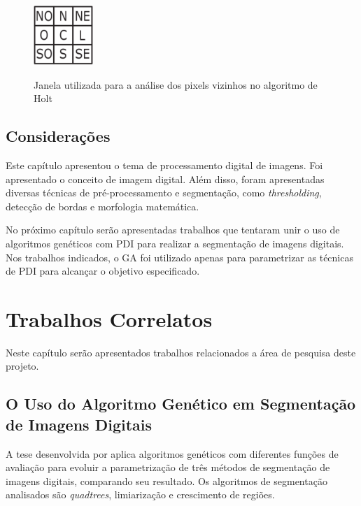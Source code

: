 \documentclass[12pt,oneside,a4paper,english,french,spanish,brazil,]{abntex2}
\begin{document}
\begin{figure}[ht]
\centering
\caption{Janela utilizada para a análise dos pixels vizinhos no algoritmo de Holt}
\includegraphics[width=0.2\textwidth]{imagens/PDI_Holt_1.PNG}
\label{fig:PDI_Holt_1}
\end{figure}

\section{Considerações}

Este capítulo apresentou o tema de processamento digital de imagens. Foi apresentado o conceito de imagem digital. Além disso, foram apresentadas diversas técnicas de pré-processamento e segmentação, como \textit{thresholding}, detecção de bordas e morfologia matemática.

No próximo capítulo serão apresentadas trabalhos que tentaram unir o uso de algoritmos genéticos com PDI para realizar a segmentação de imagens digitais. Nos trabalhos indicados, o GA foi utilizado apenas para parametrizar as técnicas de PDI para alcançar o objetivo especificado.

\chapter{Trabalhos Correlatos}
\label{chap:TrabalhosCorrelatos}

Neste capítulo serão apresentados trabalhos relacionados a área de pesquisa deste projeto.


\section{O Uso do Algoritmo Genético em Segmentação de Imagens Digitais}

A tese desenvolvida por \citet{matias:2007} aplica algoritmos genéticos com diferentes funções de avaliação para evoluir a parametrização de três métodos de segmentação de imagens digitais, comparando seu resultado. Os algoritmos de segmentação analisados são \textit{quadtrees}, limiarização e crescimento de regiões.
\end{document}
